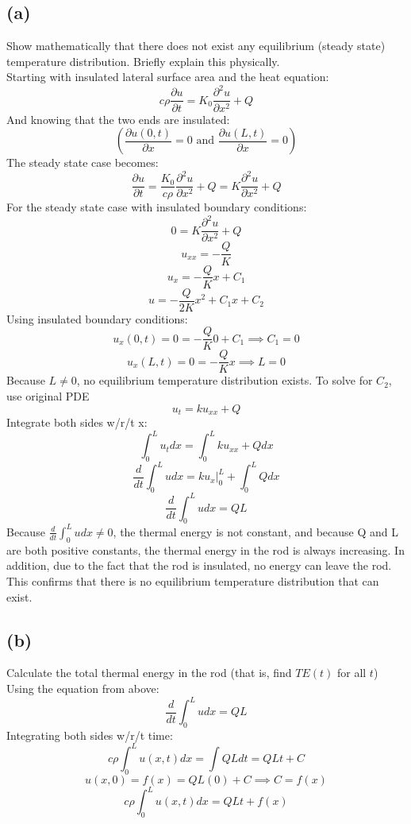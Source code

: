 \documentclass[preview,12pt]{article}
\begin{document}
    \subsection*{(a)}
        Show mathematically that there does not exist any equilibrium (steady state) temperature distribution.  Briefly explain this physically.
        $$$$
        Starting with insulated lateral surface area and the heat equation:
        $$c\rho\frac{\partial u}{\partial t}=K_0\frac{\partial^2u}{\partial x^2}+Q$$
        And knowing that the two ends are insulated:
        $$\left(\frac{\partial u(0,t)}{\partial x}=0 \textrm{ and } \frac{\partial u(L,t)}{\partial x}=0\right)$$
        The steady state case becomes:
        $$\frac{\partial u}{\partial t}=\frac{K_0}{c\rho}\frac{\partial^2u}{\partial x^2}+Q=K\frac{\partial^2u}{\partial x^2}+Q$$
        For the steady state case with insulated boundary conditions:
        $$0=K\frac{\partial^2u}{\partial x^2}+Q$$
        $$u_{xx}=-\frac{Q}{K}$$
        $$u_x=-\frac{Q}{K}x+C_1$$
        $$u=-\frac{Q}{2K}x^2+C_1x+C_2$$
        Using insulated boundary conditions:
        $$u_x(0,t)=0=-\frac{Q}{K}0+C_1 \implies C_1=0$$
        $$u_x(L,t)=0=-\frac{Q}{K}x \implies L=0$$
        Because $L\neq0$, no equilibrium temperature distribution exists.\newline
        To solve for $C_2$, use original PDE
        $$u_t=ku_{xx}+Q$$
        Integrate both sides w/r/t x:
        $$\int_0^Lu_tdx=\int_0^Lku_{xx}+Qdx$$
        $$\frac{d}{dt}\int_0^Ludx=ku_{x}|_0^L+\int_0^L Q dx$$
        $$\frac{d}{dt}\int_0^Ludx=QL$$
        Because $\frac{d}{dt}\int_0^Ludx \neq 0$, the thermal energy is not constant, and because Q and L are both positive constants, the thermal energy in the rod is always increasing.  In addition, due to the fact that the rod is insulated, no energy can leave the rod.  This confirms that there is no equilibrium temperature distribution that can exist. 
    \subsection*{(b)}
        Calculate the total thermal energy in the rod (that is, find $TE(t)$ for all $t$)
        $$$$
        Using the equation from above:
        $$\frac{d}{dt}\int_0^Ludx=QL$$
        Integrating both sides w/r/t time:
        $$c\rho\int_0^Lu(x,t)dx=\int QL dt=QLt+C$$
        $$u(x,0)=f(x)=QL(0)+C \implies C=f(x)$$
        $$c\rho\int_0^Lu(x,t)dx=QLt+f(x)$$
\end{document}
